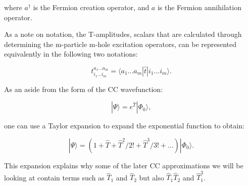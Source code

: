 where $a^\dagger$ is the Fermion creation operator, and $a$ is the Fermion annihilation operator.

As a note on notation, the T-amplitudes, scalars that are calculated through determining the m-particle m-hole excitation operators, can be represented equivalently in the following two notations:

\begin{equation}
t^{a_1...a_m}_{i_1...i_m} = \langle a_1...a_m | \hat{t} | i_1...i_m \rangle.
\end{equation}

As an aside from the form of the CC wavefunction: 

\begin{equation} \label{cc_ansatz}
    |\Psi\rangle = e^{\hat{T}}|\Phi_0\rangle,
\end{equation}

one can use a Taylor expansion to expand the exponential function to obtain:

\begin{equation} \label{cc_ansatz}
    |\Psi\rangle = (1 + \hat{T} + \hat{T}^2/2! + \hat{T}^3/3! + ...)|\Phi_0\rangle.
\end{equation}

This expansion explains why some of the later CC approximations we will be looking at contain terms such as $\hat{T}_1$ and $\hat{T}_2$ but also $\hat{T}_1\hat{T}_2$ and $\hat{T}_1^3$.